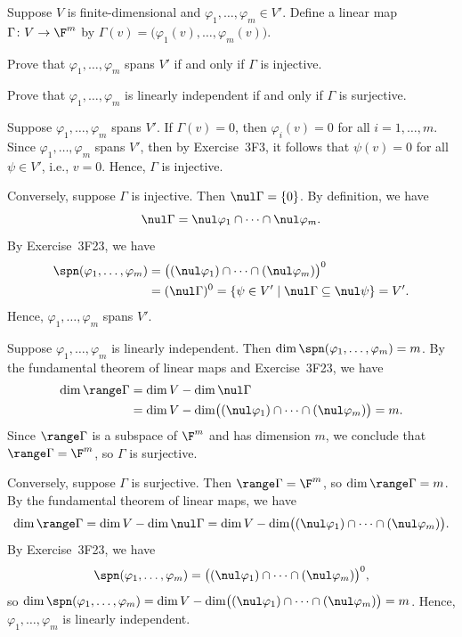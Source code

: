 \begin{exc}
\begin{exercise}
Suppose $V$ is finite-dimensional and $\varphi_1,\dots,\varphi_m\in V'$. Define
a linear map $\Gamma\colon V\to\F^m$ by
$\Gamma(v)=\bigl(\varphi_1(v),\dots,\varphi_m(v)\bigr)$.
\begin{parts}
\item Prove that $\varphi_1,\dots,\varphi_m$ spans $V'$ if and only if $\Gamma$
  is injective.
\item Prove that $\varphi_1,\dots,\varphi_m$ is linearly independent if and only
  if $\Gamma$ is surjective.
\end{parts}
\end{exercise}
\begin{solution}\leavevmode
\begin{parts}
\item Suppose $\varphi_1,\dots,\varphi_m$ spans $V'$. If $\Gamma(v)=0$, then
  $\varphi_i(v)=0$ for all $i=1,\dots,m$. Since $\varphi_1,\dots,\varphi_m$
  spans $V'$, then by Exercise~3F3, it follows that $\psi(v)=0$ for all
  $\psi\in V'$, i.e., $v=0$. Hence, $\Gamma$ is injective.

  Conversely, suppose $\Gamma$ is injective. Then $\nul\Gamma=\{0\}$. By
  definition, we have
  \[ \nul\Gamma = \nul\varphi_1\cap\cdots\cap\nul\varphi_m. \]
  By Exercise~3F23, we have
  \begin{align*}
  \spn(\varphi_1,\dots,\varphi_m)
   &= \bigl((\nul\varphi_1)\cap\cdots\cap(\nul\varphi_m)\bigr)^0\\
   &= (\nul\Gamma)^0 = \{\psi\in V' \mid \nul\Gamma\subseteq\nul\psi\} = V'.
  \end{align*}
  Hence, $\varphi_1,\dots,\varphi_m$ spans $V'$.
\item Suppose $\varphi_1,\dots,\varphi_m$ is linearly independent. Then
  $\dim\spn(\varphi_1,\dots,\varphi_m)=m$. By the fundamental theorem of linear
  maps and Exercise~3F23, we have
  \begin{align*}
  \dim\range\Gamma &= \dim V-\dim\nul\Gamma\\
   &= \dim V-\dim\bigl((\nul\varphi_1)\cap\cdots\cap(\nul\varphi_m)\bigr) = m.
  \end{align*}
  Since $\range\Gamma$ is a subspace of $\F^m$ and has dimension $m$, we
  conclude that $\range\Gamma=\F^m$, so $\Gamma$ is surjective.

  Conversely, suppose $\Gamma$ is surjective. Then $\range\Gamma=\F^m$, so
  $\dim\range\Gamma=m$. By the fundamental theorem of linear maps, we have
  \[ \dim\range\Gamma = \dim V-\dim\nul\Gamma
     = \dim V-\dim\bigl((\nul\varphi_1)\cap\cdots\cap(\nul\varphi_m)\bigr). \]
  By Exercise~3F23, we have
  \[ \spn(\varphi_1,\dots,\varphi_m)
     = \bigl((\nul\varphi_1)\cap\cdots\cap(\nul\varphi_m)\bigr)^0, \]
  so $\dim\spn(\varphi_1,\dots,\varphi_m)
  =\dim V-\dim\bigl((\nul\varphi_1)\cap\cdots\cap(\nul\varphi_m)\bigr)=m$.
  Hence, $\varphi_1,\dots,\varphi_m$ is linearly independent.
\end{parts}
\end{solution}


\end{exc}
